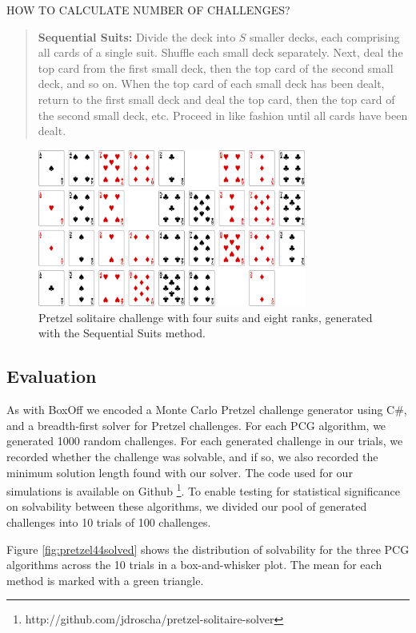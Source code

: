 \documentclass[journal]{IEEEtran}
\begin{document}
HOW TO CALCULATE NUMBER OF CHALLENGES?

\begin{quote}
    {\bf Sequential Suits:} Divide the deck into $S$ smaller decks, each comprising all cards of a single suit. Shuffle each small deck separately. Next, deal the top card from the first small deck, then the top card of the second small deck, and so on.  When the top card of each small deck has been dealt, return to the first small deck and deal the top card, then the top card of the second small deck, etc. Proceed in like fashion until all cards have been dealt.
\end{quote}



\begin{figure}[t]
\centering
\includegraphics[width=8.8cm]{pretzel4x8.png}
\caption{Pretzel solitaire challenge with four suits and eight ranks, generated with the Sequential Suits method.}
\label{fig:pretzelsequential}
\end{figure}


\subsection{Evaluation}

As with BoxOff we encoded a Monte Carlo Pretzel challenge generator using C\#, and a breadth-first solver for Pretzel challenges. For each PCG algorithm, we generated 1000 random challenges. For each generated challenge in our trials, we recorded whether the challenge was solvable, and if so, we also recorded the minimum solution length found with our solver. The code used for our simulations is available on Github \footnote{http://github.com/jdroscha/pretzel-solitaire-solver}. To enable testing for statistical significance on solvability between these algorithms, we divided our pool of generated challenges into 10 trials of 100 challenges. 

Figure \ref{fig:pretzel44solved} shows the distribution of solvability for the three PCG algorithms across the 10 trials in a box-and-whisker plot. The mean for each method is marked with a green triangle. 
\end{document}
